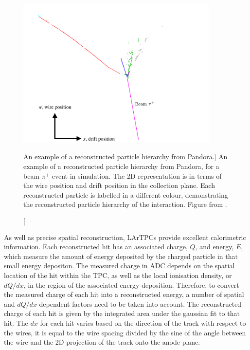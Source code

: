 \begin{figure}

	\centering

	\includegraphics[width=0.9\textwidth]{figures/pandoraEvent.pdf}

	\caption
	[An example of a reconstructed particle hierarchy from Pandora.]
	{An example of a reconstructed particle hierarchy from Pandora, for a beam
	$\pi^+$ event in \protodune{} simulation. The 2D representation is in terms 
	of the wire position and drift position in the collection plane. Each 
	reconstructed particle is labelled in a different colour, demonstrating the 
	reconstructed particle hierarchy of the interaction. Figure from 
	\cite{protoduneperf}.}

	\label{fig:pandora_pfp}

\end{figure}

As well as precise spatial reconstruction, LArTPCs provide excellent
calorimetric information. Each reconstructed hit has an associated charge, 
$Q$, and energy, $E$, which measure the amount of energy deposited by the 
charged particle in that small energy depositon. The measured charge in ADC 
depends on the spatial location of the hit within the TPC, as well as the 
local ionisation density, or $dQ/dx$, in the region of the associated energy 
deposition.  Therefore, to convert the measured charge of each hit into a 
reconstructed energy, a number of spatial and $dQ/dx$ dependent factors need 
to be taken into account.  The reconstructed charge of each hit is given by 
the integrated area under the gaussian fit to that hit. The $dx$ for each hit 
varies based on the direction of the track with respect to the wires, it is 
equal to the wire spacing divided by the sine of the angle between the wire 
and the 2D projection of the track onto the anode plane.

